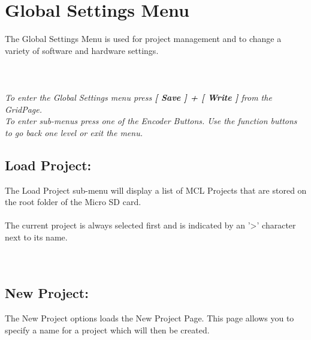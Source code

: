 \chapter{Global Settings Menu}
The Global Settings Menu is used for project management and to change a variety of software and hardware settings.\\\\
\\\\
\textit{To enter the Global Settings menu press \textbf{[ Save ] + [ Write ]} from the GridPage.\\
To enter sub-menus press one of the Encoder Buttons. Use the function buttons to go back one level or exit the menu.}
\section{Load Project:}
The Load Project sub-menu will display a list of MCL Projects that are stored on the root folder of the Micro SD card.\\\\
The current project is always selected first and is indicated by an '>' character next to its name.\\\\
\\
\section{New Project:}
The New Project options loads the New Project Page. This page allows you to specify a name for a project which will then be created.\\
\\
